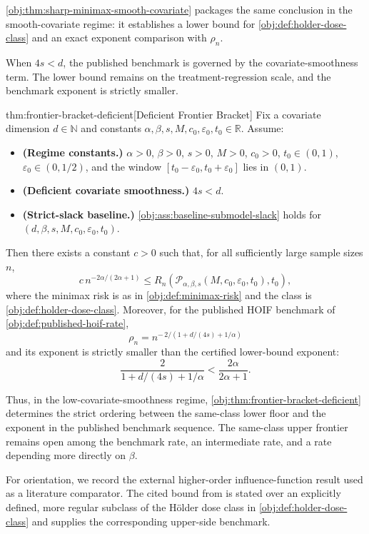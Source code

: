 \cref{obj:thm:sharp-minimax-smooth-covariate} packages the same conclusion in the smooth-covariate regime: it establishes a lower bound for \cref{obj:def:holder-dose-class} and an exact exponent comparison with \(\rho_n\).

When \(4s<d\), the published benchmark is governed by the covariate-smoothness term. The lower bound remains on the treatment-regression scale, and the benchmark exponent is strictly smaller.

\begin{theoremv}{thm:frontier-bracket-deficient}[Deficient Frontier Bracket]
Fix a covariate dimension $d\in\mathbb N$ and constants
$\alpha,\beta,s,M,c_0,\varepsilon_0,t_0\in\mathbb R$.  Assume:
\begin{itemize}
\item \textbf{(Regime constants.)}  $\alpha>0$, $\beta>0$, $s>0$, $M>0$, $c_0>0$, $t_0\in(0,1)$, $\varepsilon_0\in(0,1/2)$, and the window $[t_0-\varepsilon_0,t_0+\varepsilon_0]$ lies in $(0,1)$.
\item \textbf{(Deficient covariate smoothness.)}  $4s<d$.
\item \textbf{(Strict-slack baseline.)}  \cref{obj:ass:baseline-submodel-slack} holds for $(d,\beta,s,M,c_0,\varepsilon_0,t_0)$.
\end{itemize}
Then there exists a constant $c>0$ such that, for all sufficiently large sample sizes $n$,
\[
c\,n^{-2\alpha/(2\alpha+1)}
\le
R_n\!\left(
\mathcal P_{\alpha,\beta,s}(M,c_0,\varepsilon_0,t_0),t_0
\right),
\]
where the minimax risk is as in \cref{obj:def:minimax-risk} and the class is \cref{obj:def:holder-dose-class}.  Moreover, for the published HOIF benchmark of \cref{obj:def:published-hoif-rate},
\[
\rho_n
=
n^{-\,2/(1+d/(4s)+1/\alpha)}
\]
and its exponent is strictly smaller than the certified lower-bound exponent:
\[
\frac{2}{1+d/(4s)+1/\alpha}
<
\frac{2\alpha}{2\alpha+1}.
\]
\end{theoremv}

Thus, in the low-covariate-smoothness regime, \cref{obj:thm:frontier-bracket-deficient} determines the strict ordering between the same-class lower floor and the exponent in the published benchmark sequence. The same-class upper frontier remains open among the benchmark rate, an intermediate rate, and a rate depending more directly on \(\beta\).

For orientation, we record the external higher-order influence-function result used as a literature comparator. The cited bound from \citet{bonvini2022} is stated over an explicitly defined, more regular subclass of the Hölder dose class in \cref{obj:def:holder-dose-class} and supplies the corresponding upper-side benchmark.

